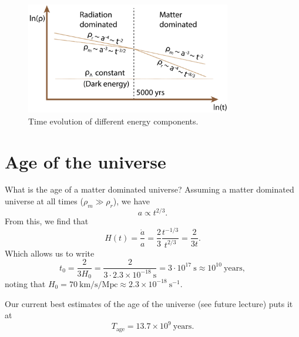 \documentclass[a4paper,12pt]{article}
\theoremstyle{remark}
\newcommand{\mrm}[1]{\mathrm{#1}}
\renewcommand{\=}[1]{\stackrel{#1}{=}} %
\theoremstyle{plain}
\theoremstyle{definition}
\begin{document}
\begin{figure}[t]
\begin{center}
    \includegraphics*[angle=0,width=0.8\textwidth]{img/time_evolution.png}
    \caption[Insert text]{Time evolution of different energy components.}
\label{fig:time_evolution}
\end{center}
\end{figure}

\section{Age of the universe}
What is the age of a matter dominated universe? Assuming a matter dominated universe at all times ($\rho _m \gg \rho _r$), we have
\begin{equation}
a \propto t^{2/3}.
\end{equation}
From this, we find that
\begin{equation}
H(t) = \frac{\dot{a}}{a} = \frac{2}{3}\frac{t^{-1/3}}{t^{2/3}} = \frac{2}{3t}.
\end{equation}
Which allows us to write
\begin{equation}
t_0 = \frac{2}{3H_0} = \frac{2}{3 \cdot 2.3 \times 10^{-18} \:\mrm{s}} = 3\cdot10^{17} \:\mrm{s} \approx 10^{10} \:\mrm{years},
\end{equation}
noting that $H_0 = 70 \:\mrm{km/s/Mpc} \approx 2.3 \times 10^{-18} \:\mrm{s}^{-1}$.

Our current best estimates of the age of the universe (see future lecture) puts it at 
\begin{equation}
T _\mrm{age} = 13.7 \times 10^{9} \:\mrm{years}.
\end{equation}
\end{document}
